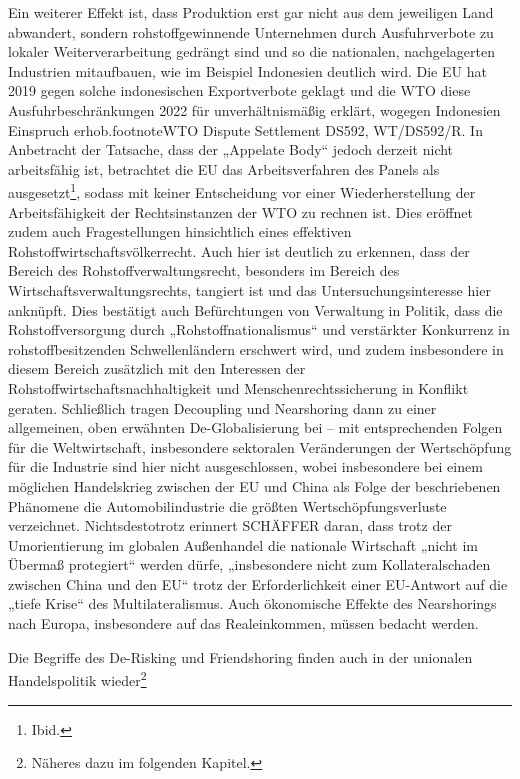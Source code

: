 \documentclass[12pt,a4paper,oneside]{book} %
\begin{document}
{	Ein weiterer Effekt ist, dass Produktion erst gar nicht aus dem jeweiligen Land abwandert, sondern rohstoffgewinnende Unternehmen durch Ausfuhrverbote zu lokaler Weiterverarbeitung gedrängt sind und so die nationalen, nachgelagerten Industrien mitaufbauen, wie im Beispiel Indonesien deutlich wird. Die EU hat 2019 gegen solche indonesischen Exportverbote geklagt und die WTO diese Ausfuhrbeschränkungen 2022 für unverhältnismäßig erklärt, wogegen Indonesien Einspruch erhob.footnote{WTO Dispute Settlement DS592, WT/DS592/R.} In Anbetracht der Tatsache, dass der „Appelate Body“ jedoch derzeit nicht arbeitsfähig ist, betrachtet die EU das Arbeitsverfahren des Panels als ausgesetzt\footnote{Ibid.}, sodass mit keiner Entscheidung vor einer Wiederherstellung der Arbeitsfähigkeit der Rechtsinstanzen der WTO zu rechnen ist. Dies eröffnet zudem auch Fragestellungen hinsichtlich eines effektiven Rohstoffwirtschaftsvölkerrecht. Auch hier ist deutlich zu erkennen, dass der Bereich des Rohstoffverwaltungsrecht, besonders im Bereich des Wirtschaftsverwaltungsrechts, tangiert ist und das Untersuchungsinteresse hier anknüpft. Dies bestätigt auch Befürchtungen von Verwaltung in Politik, dass die Rohstoffversorgung durch „Rohstoffnationalismus“ und verstärkter Konkurrenz in rohstoffbesitzenden Schwellenländern erschwert wird, und zudem insbesondere in diesem Bereich zusätzlich mit den Interessen der Rohstoffwirtschaftsnachhaltigkeit und Menschenrechtssicherung in Konflikt geraten.\autocite{feichtner_besonderheit_2016} Schließlich tragen Decoupling und Nearshoring dann zu einer allgemeinen, oben erwähnten De-Globalisierung bei – mit entsprechenden Folgen für die Weltwirtschaft, insbesondere sektoralen Veränderungen der Wertschöpfung für die Industrie sind hier nicht ausgeschlossen, wobei insbesondere bei einem möglichen Handelskrieg zwischen der EU und China als Folge der beschriebenen Phänomene die Automobilindustrie die größten Wertschöpfungsverluste verzeichnet.\autocite[3]{fuest_geopolitische_2022} Nichtsdestotrotz erinnert SCHÄFFER daran, dass trotz der Umorientierung im globalen Außenhandel die nationale Wirtschaft „nicht im Übermaß protegiert“ werden dürfe, „insbesondere nicht zum Kollateralschaden zwischen China und den EU“ trotz der Erforderlichkeit einer EU-Antwort auf die „tiefe Krise“ des Multilateralismus.\autocite[700]{schaffer_ausenwirtschaftsrecht_2023} Auch ökonomische Effekte des Nearshorings nach Europa, insbesondere auf das Realeinkommen, müssen bedacht werden.\autocite{sandkamp_reshoring_2022}
	
	Die Begriffe des De-Risking und Friendshoring finden auch in der unionalen Handelspolitik wieder\footnote{Näheres dazu im folgenden Kapitel.}
	

}
\end{document}
